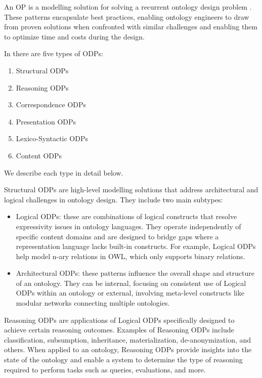 An OP is a modelling solution for solving a recurrent ontology design problem \cite{gangemi2009ontology}.
These patterns encapsulate best practices, enabling ontology engineers to draw from proven solutions when confronted with similar challenges and enabling them to optimize time and costs during the design. 

In \cite{falbo2013ontology} there are five types of ODPs:
\begin{enumerate}
    \item Structural ODPs

    \item Reasoning ODPs

    \item Correspondence ODPs

    \item Presentation ODPs

    \item Lexico-Syntactic ODPs

    \item Content ODPs
\end{enumerate}
We describe each type in detail below.

Structural ODPs are high-level modelling solutions that address architectural and logical challenges in ontology design.
They include two main subtypes:
\begin{itemize}
    \item Logical ODPs: these are combinations of logical constructs that resolve expressivity issues in ontology languages. They operate independently of specific content domains and are designed to bridge gaps where a representation language lacks built-in constructs. For example, Logical ODPs help model n-ary relations in OWL, which only supports binary relations.

    \item Architectural ODPs: these patterns influence the overall shape and structure of an ontology. They can be internal, focusing on consistent use of Logical ODPs within an ontology or external, involving meta-level constructs like modular networks connecting multiple ontologies.
\end{itemize}

Reasoning ODPs are applications of Logical ODPs specifically designed to achieve certain reasoning outcomes.
Examples of Reasoning ODPs include classification, subsumption, inheritance, materialization, de-anonymization, and others.
When applied to an ontology, Reasoning ODPs provide insights into the state of the ontology and enable a system to determine the type of reasoning required to perform tasks such as queries, evaluations, and more.


